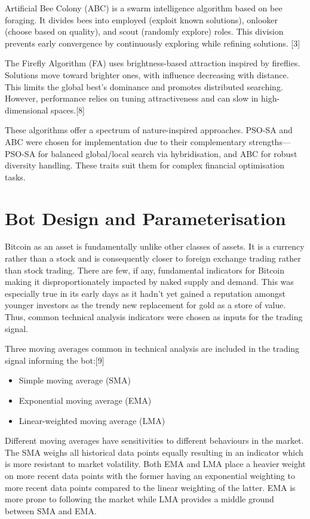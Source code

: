 \documentclass[a4paper, 12pt]{extarticle}
\begin{document}
Artificial Bee Colony (ABC) is a swarm intelligence algorithm based on bee foraging. It divides bees into employed (exploit known solutions), onlooker (choose based on quality), and scout (randomly explore) roles. This division prevents early convergence by continuously exploring while refining solutions. [3] 

The Firefly Algorithm (FA) uses brightness-based attraction inspired by fireflies. Solutions move toward brighter ones, with influence decreasing with distance. This limits the global best's dominance and promotes distributed searching. However, performance relies on tuning attractiveness and can slow in high-dimensional spaces.[8] 

These algorithms offer a spectrum of nature-inspired approaches. PSO-SA and ABC were chosen for implementation due to their complementary strengths—PSO-SA for balanced global/local search via hybridisation, and ABC for robust diversity handling. These traits suit them for complex financial optimisation tasks. 

\section{Bot Design and Parameterisation}
Bitcoin as an asset is fundamentally unlike other classes of assets. It is a currency rather than a stock and is consequently closer to foreign exchange trading rather than stock trading. There are few, if any, fundamental indicators for Bitcoin making it disproportionately impacted by naked supply and demand. This was especially true in its early days as it hadn't yet gained a reputation amongst younger investors as the trendy new replacement for gold as a store of value. Thus, common technical analysis indicators were chosen as inputs for the trading signal. 

Three moving averages common in technical analysis are included in the trading signal informing the bot:[9] 

\begin{itemize}
    \item Simple moving average (SMA) 
    \item Exponential moving average (EMA) 
    \item Linear-weighted moving average (LMA) 
\end{itemize}

Different moving averages have sensitivities to different behaviours in the market. The SMA weighs all historical data points equally resulting in an indicator which is more resistant to market volatility. Both EMA and LMA place a heavier weight on more recent data points with the former having an exponential weighting to more recent data points compared to the linear weighting of the latter. EMA is more prone to following the market while LMA provides a middle ground between SMA and EMA. 
\end{document}

